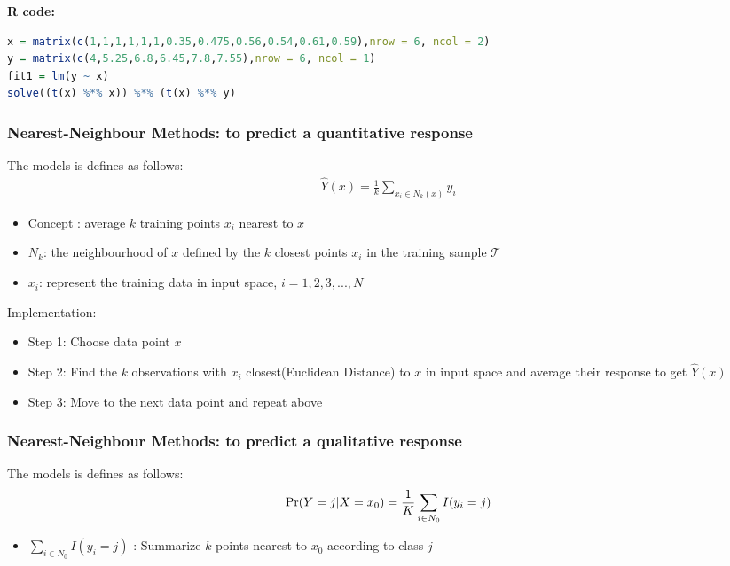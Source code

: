     \documentclass[12pt,fleqn,a4paper]{article}
\theoremstyle{definition}
\theoremstyle{plain}
\begin{document}
\begin{framed}
\textbf{R code:}
\begin{lstlisting}[language=R]
x = matrix(c(1,1,1,1,1,1,0.35,0.475,0.56,0.54,0.61,0.59),nrow = 6, ncol = 2)
y = matrix(c(4,5.25,6.8,6.45,7.8,7.55),nrow = 6, ncol = 1)
fit1 = lm(y ~ x)
solve((t(x) %*% x)) %*% (t(x) %*% y)
\end{lstlisting}
\end{framed}


\subsubsection{\textbf{Nearest-Neighbour Methods: to predict a quantitative response}}
The models is defines as follows:
\begin{gather}
\hat{Y}(x)=\frac{1}{k}\sum\limits_{x_{i}\in N_{k}(x)} y_{i}
\end{gather}

\begin{itemize}
\item Concept : average $k$ training points $x_{i}$ nearest to $x$
\item $N_{k}$: the neighbourhood of $x$ defined by the $k$ closest points $x_{i}$ in the training sample $\mathcal{T}$
\item $x_{i}$: represent the training data in input space, $i=1,2,3,...,N$
\end{itemize}

Implementation:
\begin{itemize}
\item Step 1: Choose data point $x$
\item Step 2: Find the $k$ observations with $x_{i}$ closest(Euclidean Distance) to $x$ in input space and average their response to get $\hat{Y}(x)$
\item Step 3: Move to the next data point and repeat above
\end{itemize}


\subsubsection{\textbf{Nearest-Neighbour Methods: to predict a qualitative response}}
The models is defines as follows:
\begin{gather}
{\rm Pr}(Y=j|X=x_{0}) = \frac{1}{K}\sum\limits_{i \in N_{0}}I(y_{i}=j)
\end{gather}

\begin{itemize}
\item $\sum\limits_{i \in N_{0}}I(y_{i}=j)$ : Summarize $k$ points nearest to $x_{0}$ according to class $j$
\end{itemize}
\end{document}
